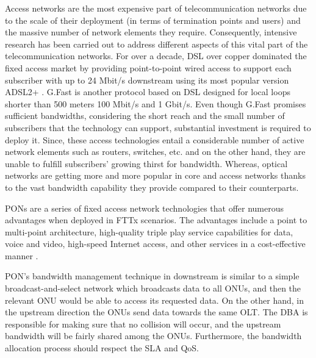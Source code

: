 Access networks are the most expensive part of telecommunication networks due to the scale of their deployment (in terms of termination points and users) and the massive number of network elements they require. Consequently, intensive research has been carried out to address different aspects of this vital part of the telecommunication networks. For over a decade, \ac{DSL} over copper dominated the fixed access market by providing point-to-point wired access to support each subscriber with up to 24 Mbit/s downstream using its most popular version ADSL2+ \cite{ituG.992.5}. \ac{G.Fast} \cite{ituG.9700} is another protocol based on \ac{DSL} designed for local loops shorter than 500 meters 100 Mbit/s and 1 Gbit/s. Even though \ac{G.Fast} promises sufficient bandwidths, considering the short reach and the small number of subscribers that the technology can support, substantial investment is required to deploy it. %
Since, these access technologies entail a considerable number of active network elements such as routers, switches, etc. and on the other hand, they are unable to fulfill subscribers' growing thirst for bandwidth. Whereas, optical networks are getting more and more popular in core and access networks thanks to the vast bandwidth capability they provide compared to their counterparts.

\acp{PON} are a series of fixed access network technologies that offer numerous advantages when deployed in \ac{FTTx} scenarios. The advantages include a point to multi-point architecture, high-quality triple play service capabilities for data, voice and video, high-speed Internet access, and other services in a cost-effective manner \cite{Abbas201653}.


\ac{PON}'s bandwidth management technique in downstream is similar to a simple broadcast-and-select network which broadcasts data to all \acp{ONU}, and then the relevant \ac{ONU} would be able to access its requested data. On the other hand, in the upstream direction the \acp{ONU} send data towards the same \ac{OLT}. The \acf{DBA} is responsible for making sure that no collision will occur, and the upstream bandwidth will be fairly shared among the \acp{ONU}. Furthermore, the bandwidth allocation process should respect the \ac{SLA} and \ac{QoS}.

